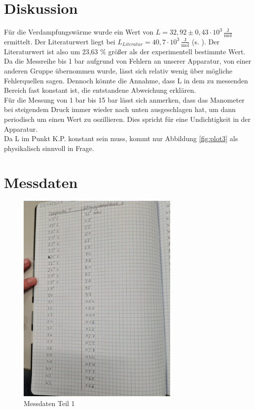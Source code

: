 \section{Diskussion}
\label{sec:Diskussion}
Für die Verdampfungswärme wurde ein Wert von $L = 32,92 \pm 0,43 \cdot 10^3 \, \mathrm{\frac{J}{mol}}$ ermittelt.
Der Literaturwert liegt bei $L_{Literatur} = 40,7 \cdot 10^3 \, \mathrm{\frac{J}{mol}}$ (s. \cite{verdampf}).
Der Literaturwert ist also um 23,63 \% größer als der experimentell bestimmte Wert.\\
Da die Messreihe bis 1 bar aufgrund von Fehlern an unserer Apparatur, von einer anderen Gruppe übernommen wurde, lässt sich relativ wenig
über mögliche Fehlerquellen sagen. Dennoch könnte die Annahme, dass L in dem zu messenden Bereich fast konstant ist, die entstandene Abweichung
erklären.\\
Für die Messung von 1 bar bis 15 bar lässt sich anmerken, dass das Manometer bei steigendem Druck immer wieder nach unten ausgeschlagen hat, um 
dann periodisch um einen Wert zu oszillieren. Dies spricht für eine Undichtigkeit in der Apparatur.\\
Da L im Punkt K.P. konstant sein muss, kommt nur Abbildung \ref{fig:plot3} als physikalisch sinnvoll in Frage.
\newpage

\section{Messdaten}
\label{sec:Messdaten}

\begin{figure}
  \centering
  \includegraphics[width=0.7\textwidth]{Messdaten1.jpg}
  \caption{Messdaten Teil 1}
  \label{fig:M1}
\end{figure}

